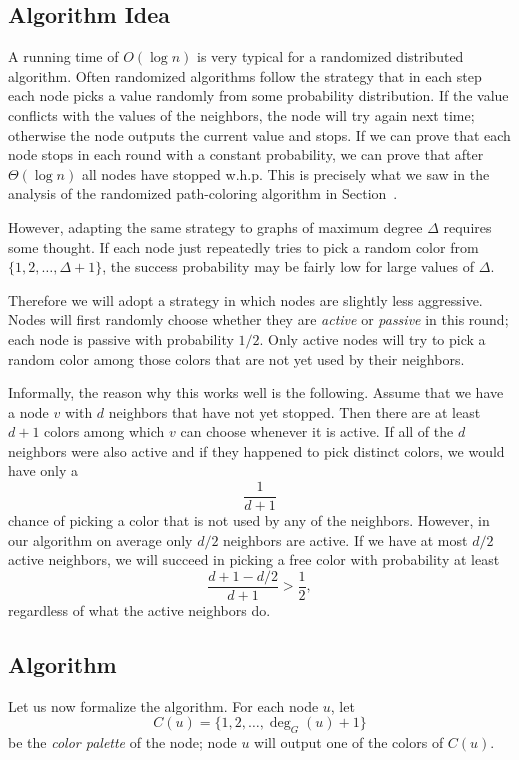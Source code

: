 \subsection{Algorithm Idea}

A running time of $O(\log n)$ is very typical for a randomized distributed algorithm. Often randomized algorithms follow the strategy that in each step each node picks a value randomly from some probability distribution. If the value conflicts with the values of the neighbors, the node will try again next time; otherwise the node outputs the current value and stops. If we can prove that each node stops in each round with a constant probability, we can prove that after $\Theta(\log n)$ all nodes have stopped w.h.p. This is precisely what we saw in the analysis of the randomized path-coloring algorithm in Section~.

However, adapting the same strategy to graphs of maximum degree $\Delta$ requires some thought. If each node just repeatedly tries to pick a random color from $\{1,2,\dotsc,\Delta+1\}$, the success probability may be fairly low for large values of $\Delta$.

Therefore we will adopt a strategy in which nodes are slightly less aggressive. Nodes will first randomly choose whether they are \emph{active} or \emph{passive} in this round; each node is passive with probability $1/2$. Only active nodes will try to pick a random color among those colors that are not yet used by their neighbors.

Informally, the reason why this works well is the following. Assume that we have a node $v$ with $d$ neighbors that have not yet stopped. Then there are at least $d+1$ colors among which $v$ can choose whenever it is active. If all of the $d$ neighbors were also active and if they happened to pick distinct colors, we would have only a \[\frac{1}{d+1}\] chance of picking a color that is not used by any of the neighbors. However, in our algorithm on average only $d/2$ neighbors are active. If we have at most $d/2$ active neighbors, we will succeed in picking a free color with probability at least \[\frac{d+1 - d/2}{d+1} > \frac{1}{2},\] regardless of what the active neighbors do.


\subsection{Algorithm}

Let us now formalize the algorithm. For each node $u$, let
\[
    C(u) = \{1,2,\dotsc,\deg_G(u)+1\}
\]
be the \emph{color palette} of the node; node $u$ will output one of the colors of $C(u)$. 

